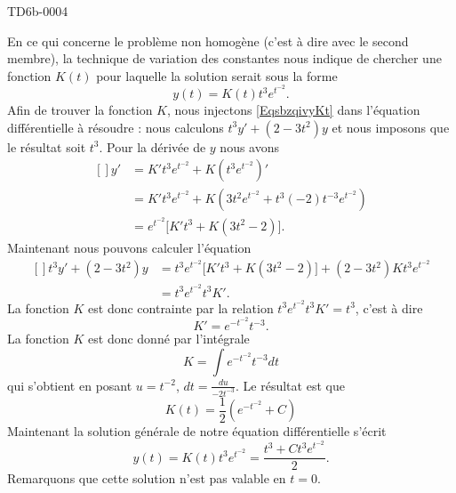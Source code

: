 \begin{corrige}{TD6b-0004}
\begin{enumerate}
			En ce qui concerne le problème non homogène (c'est à dire avec le second membre), la technique de variation des constantes nous indique de chercher une fonction $K(t)$ pour laquelle la solution serait sous la forme
			\begin{equation}		\label{EqsbzqivyKt}
				y(t)=K(t)t^3 e^{t^{-2}}.
			\end{equation}
			Afin de trouver la fonction $K$, nous injectons \eqref{EqsbzqivyKt} dans l'équation différentielle à résoudre : nous calculons $t^3y'+(2-3t^2)y$ et nous imposons que le résultat soit $t^3$. Pour la dérivée de $y$ nous avons
			\begin{equation}
				\begin{aligned}[]
					y'&=K't^3 e^{t^{-2}}+K\left( t^3 e^{t^{-2}} \right)'\\
					&=K't^3 e^{t^{-2}}+K\left( 3t^2e^{t^{-2}}+t^3(-2)t^{-3}e^{t^{-2}} \right)\\
					&=e^{t^{-2}}\big[ K't^3+K(3t^2-2) \big].
				\end{aligned}
			\end{equation}
			Maintenant nous pouvons calculer l'équation
			\begin{equation}
				\begin{aligned}[]
					t^3y'+(2-3t^2)y&=t^3e^{t^{-2}}\big[ K't^3+K(3t^2-2) \big]+(2-3t^2)Kt^3e^{t^{-2}}\\
					&=t^3e^{t^{-2}}t^3K'.
				\end{aligned}
			\end{equation}
			La fonction $K$ est donc contrainte par la relation $t^3e^{t^{-2}}t^3K'=t^3$, c'est à dire
			\begin{equation}
				K'= e^{-t^{-2}}t^{-3}.
			\end{equation}
			La fonction $K$ est donc donné par l'intégrale
			\begin{equation}
				K=\int e^{-t^{-2}}t^{-3}dt
			\end{equation}
			qui s'obtient en posant $u=t^{-2}$, $dt=\frac{ du }{ -2t^{-3} }$. Le résultat est que
			\begin{equation}
				K(t)=\frac{ 1 }{2}\left(  e^{-t^{-2}}+C \right)
			\end{equation}
			Maintenant la solution générale de notre équation différentielle s'écrit
			\begin{equation}
				y(t)=K(t)t^3 e^{t^{-2}}=\frac{ t^3+Ct^3 e^{t^{-2}} }{ 2 }.
			\end{equation}
            Remarquons que cette solution n'est pas valable en \( t=0\).
			
	\end{enumerate}

\end{corrige}
